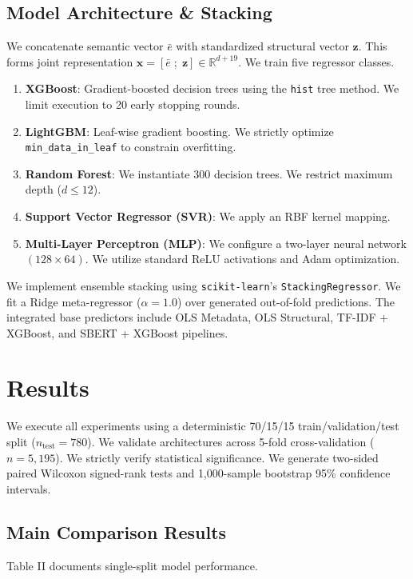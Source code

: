 \documentclass[conference]{IEEEtran}
\begin{document}
\subsection{Model Architecture \& Stacking}
We concatenate semantic vector $\bar{e}$ with standardized structural vector $\mathbf{z}$. This forms joint representation $\mathbf{x} = [\bar{e} \; ; \; \mathbf{z}] \in \mathbb{R}^{d+19}$. We train five regressor classes. 
\begin{enumerate}
\item \textbf{XGBoost}: Gradient-boosted decision trees using the \texttt{hist} tree method. We limit execution to 20 early stopping rounds.
\item \textbf{LightGBM}: Leaf-wise gradient boosting. We strictly optimize \texttt{min\_data\_in\_leaf} to constrain overfitting.
\item \textbf{Random Forest}: We instantiate 300 decision trees. We restrict maximum depth ($d \le 12$).
\item \textbf{Support Vector Regressor (SVR)}: We apply an RBF kernel mapping. 
\item \textbf{Multi-Layer Perceptron (MLP)}: We configure a two-layer neural network $(128 \times 64)$. We utilize standard ReLU activations and Adam optimization.
\end{enumerate}

We implement ensemble stacking using \texttt{scikit-learn}'s \texttt{StackingRegressor}. We fit a Ridge meta-regressor ($\alpha = 1.0$) over generated out-of-fold predictions. The integrated base predictors include OLS Metadata, OLS Structural, TF-IDF + XGBoost, and SBERT + XGBoost pipelines.

\section{Results}

We execute all experiments using a deterministic 70/15/15 train/validation/test split ($n_{\text{test}} = 780$). We validate architectures across 5-fold cross-validation ($n = 5,195$). We strictly verify statistical significance. We generate two-sided paired Wilcoxon signed-rank tests and 1,000-sample bootstrap 95\% confidence intervals.

\subsection{Main Comparison Results}
Table II documents single-split model performance.
\end{document}
